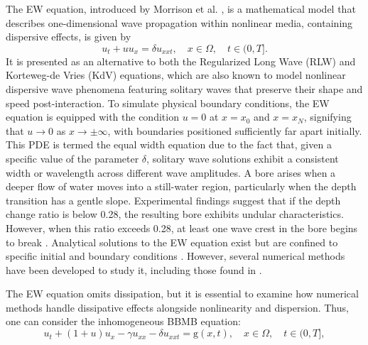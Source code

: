\documentclass[11pt,a4paper]{amsart}
\theoremstyle{plain}
\theoremstyle{definition}
\theoremstyle{remark}
\numberwithin{equation}{section}
\begin{document}
\par The EW equation, introduced by Morrison et al. \cite{morrison1984scattering}, is a mathematical model that describes one-dimensional wave propagation within nonlinear media, containing dispersive effects, is given by
\begin{equation}\label{eqn:EW}
       u_t + u u_x  = \delta u_{xxt}, \quad x \in \Omega, \quad t \in (0, T].
\end{equation}
It is presented as an alternative to both the Regularized Long Wave (RLW) and Korteweg-de Vries (KdV) equations, which are also known to model nonlinear dispersive wave phenomena featuring solitary waves that preserve their shape and speed post-interaction. To simulate physical boundary conditions, the EW equation is equipped with the condition $u = 0 $ at $ x = x_0 $ and $ x = x_N $, signifying that $ u \to 0 $ as $ x \to \pm \infty $, with boundaries positioned sufficiently far apart initially. This PDE is termed the equal width equation due to the fact that, given a specific value of the parameter $ \delta $, solitary wave solutions exhibit a consistent width or wavelength across different wave amplitudes. A bore arises when a deeper flow of water moves into a still-water region, particularly when the depth transition has a gentle slope. Experimental findings suggest that if the depth change ratio is below 0.28, the resulting bore exhibits undular characteristics. However, when this ratio exceeds 0.28, at least one wave crest in the bore begins to break \cite{peregrine1966calculations}. Analytical solutions to the EW equation exist but are confined to specific initial and boundary conditions \cite{hamdi2003exact}. However, several numerical methods have been developed to study it, including those found in \cite{gardner1997simulations, esen2005numerical, saka2006finite, kumar2016b, kumar2020modified, salian2024exponential, salian2024novel}.
\par
The EW equation omits dissipation, but it is essential to examine how numerical methods handle dissipative effects alongside nonlinearity and dispersion. Thus, one can consider the inhomogeneous BBMB equation:
\begin{equation}\label{eqn:BBMB}
    u_t + (1+u) u_x - \gamma u_{xx} - \delta u_{xxt} = \mathrm{g}(x,t), \quad x \in \Omega, \quad t \in (0, T],
\end{equation}
\end{document}
